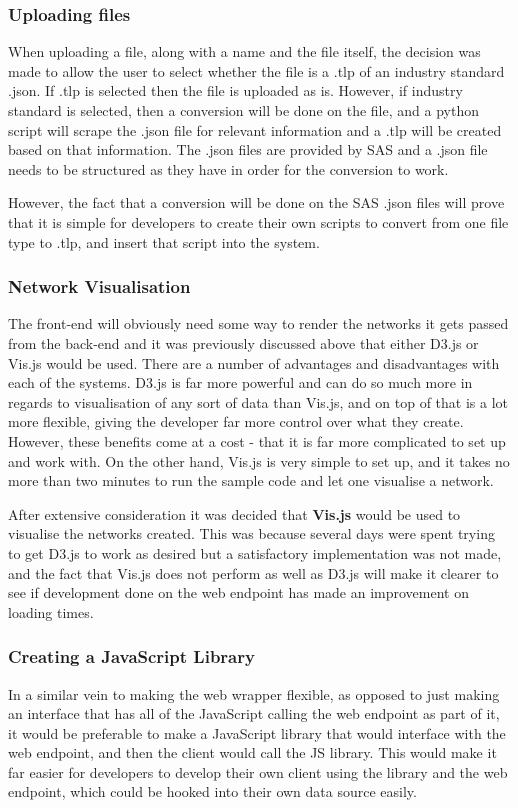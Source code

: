 \documentclass[../dissertation.tex]{subfiles}
\begin{document}
\subsubsection{Uploading files}

When uploading a file, along with a name and the file itself, the decision was made to allow the user to select whether the file is a .tlp of an industry standard .json. If .tlp is selected then the file is uploaded as is. However, if industry standard is selected, then a conversion will be done on the file, and a python script will scrape the .json file for relevant information and a .tlp will be created based on that information. The .json files are provided by SAS and a .json file needs to be structured as they have in order for the conversion to work. 

However, the fact that a conversion will be done on the SAS .json files will prove that it is simple for developers to create their own scripts to convert from one file type to .tlp, and insert that script into the system.

\subsubsection{Network Visualisation}

The front-end will obviously need some way to render the networks it gets passed from the back-end and it was previously discussed above that either D3.js or Vis.js would be used. There are a number of advantages and disadvantages with each of the systems. D3.js is far more powerful and can do so much more in regards to visualisation of any sort of data than Vis.js, and on top of that is a lot more flexible, giving the developer far more control over what they create. However, these benefits come at a cost - that it is far more complicated to set up and work with. On the other hand, Vis.js is very simple to set up, and it takes no more than two minutes to run the sample code and let one visualise a network. 

After extensive consideration it was decided that \textbf{Vis.js} would be used to visualise the networks created. This was because several days were spent trying to get D3.js to work as desired but a satisfactory implementation was not made, and the fact that Vis.js does not perform as well as D3.js will make it clearer to see if development done on the web endpoint has made an improvement on loading times.

\subsubsection{Creating a JavaScript Library}
In a similar vein to making the web wrapper flexible, as opposed to just making an interface that has all of the JavaScript calling the web endpoint as part of it, it would be preferable to make a JavaScript library that would interface with the web endpoint, and then the client would call the JS library. This would make it far easier for developers to develop their own client using the library and the web endpoint, which could be hooked into their own data source easily.
\end{document}
